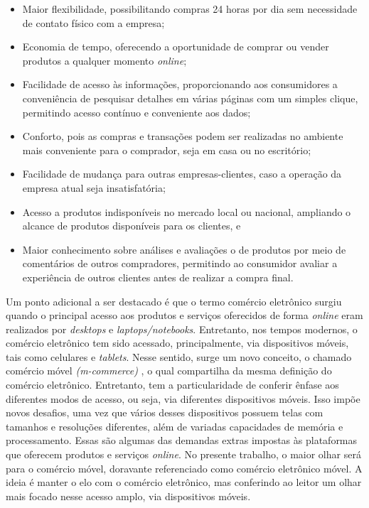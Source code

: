 \begin{itemize}
    \item Maior flexibilidade, possibilitando compras 24 horas por dia sem necessidade de contato físico com a empresa;
    \item Economia de tempo, oferecendo a oportunidade de comprar ou vender produtos a qualquer momento \textit{online};
    \item Facilidade de acesso às informações, proporcionando aos consumidores a conveniência de pesquisar detalhes em várias páginas com um simples clique, permitindo acesso contínuo e conveniente aos dados;
    \item Conforto, pois as compras e transações podem ser realizadas no ambiente mais conveniente para o comprador, seja em casa ou no escritório;
    \item Facilidade de mudança para outras empresas-clientes, caso a operação da empresa atual seja insatisfatória;
    \item Acesso a produtos indisponíveis no mercado local ou nacional, ampliando o alcance de produtos disponíveis para os clientes, e
    \item Maior conhecimento sobre análises e avaliações o de produtos por meio de comentários de outros compradores, permitindo ao consumidor avaliar a experiência de outros clientes antes de realizar a compra final.
\end{itemize}

Um ponto adicional a ser destacado é que o termo comércio eletrônico surgiu quando o principal acesso aos produtos e serviços oferecidos de forma \textit{online} eram realizados por \textit{desktops} e \textit{laptops/notebooks}. Entretanto, nos tempos modernos, o comércio eletrônico tem sido acessado, principalmente, via dispositivos móveis, tais como celulares e \textit{tablets}. Nesse sentido, surge um novo conceito, o chamado comércio móvel \textit{(m-commerce)} \cite{LucasAlmeida}, o qual compartilha da mesma definição do comércio eletrônico. Entretanto, tem a particularidade de conferir ênfase aos diferentes modos de acesso, ou seja, via diferentes dispositivos móveis. Isso impõe novos desafios, uma vez que vários desses dispositivos possuem telas com tamanhos e resoluções diferentes, além de variadas capacidades de memória e processamento. Essas são algumas das demandas extras impostas às plataformas que oferecem produtos e serviços \textit{online}. No presente trabalho, o maior olhar será para o comércio móvel, doravante referenciado como comércio eletrônico móvel. A ideia é manter o elo com o comércio eletrônico, mas conferindo ao leitor um olhar mais focado nesse acesso amplo, via dispositivos móveis.

